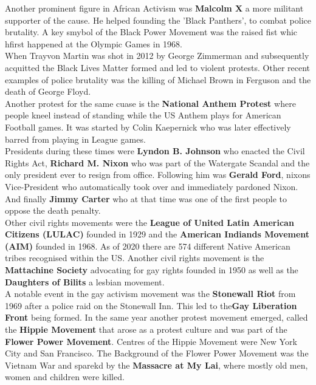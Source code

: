 \documentclass{article}
\begin{document}
	Another prominent figure in African Activism was \textbf{Malcolm X} a more militant supporter of the cause. He helped founding the 'Black Panthers', to combat police brutality. A key smybol of the Black Power Movement was the raised fist whic hfirst happened at the Olympic Games in 1968. \\
	When Trayvon Martin was shot in 2012 by George Zimmerman and subsequently acquitted the Black Lives Matter formed and led to violent protests. Other recent examples of police brutality was the killing of Michael Brown in Ferguson and the death of George Floyd. \\
	Another protest for the same cuase is the \textbf{National Anthem Protest} where people kneel instead of standing while the US Anthem plays for American Football games. It was started by Colin Kaepernick who was later effectively barred from playing in League games. \\
	Presidents during these times were \textbf{Lyndon B. Johnson} who enacted the Civil Rights Act, \textbf{Richard M. Nixon} who was part of the Watergate Scandal and the only president ever to resign from office. Following him was \textbf{Gerald Ford}, nixons Vice-President who automatically took over and immediately pardoned Nixon. And finally \textbf{Jimmy Carter} who at that time was one of the first people to oppose the death penalty. \\
	Other civil rights movements were the \textbf{League of United Latin American Citizens (LULAC)} founded in 1929 and the \textbf{American Indiands Movement (AIM)} founded in 1968. As of 2020 there are 574 different Native American tribes recognised within the US. Another civil rights movement is the \textbf{Mattachine Society} advocating for gay rights founded in 1950 as well as the \textbf{Daughters of Bilits} a lesbian movement. \\
	A notable event in the gay activism movement was the \textbf{Stonewall Riot} from 1969 after a police raid on the Stonewall Inn. This led to the\textbf{Gay Liberation Front} being formed. In the same year another protest movement emerged, called the \textbf{Hippie Movement} that arose as a protest culture and was part of the \textbf{Flower Power Movement}. Centres of the Hippie Movement were New York City and San Francisco. The Background of the Flower Power Movement was the Vietnam War and sparekd by the \textbf{Massacre at My Lai}, where mostly old men, women and children were killed.\\
	
\end{document}
